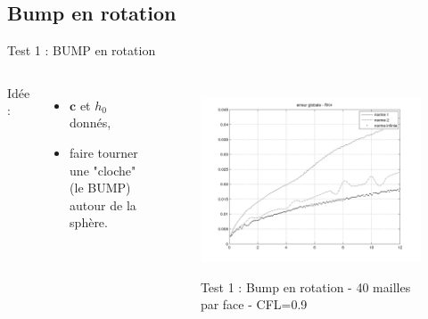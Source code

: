 \documentclass[11pt]{beamer}
\begin{document}
\subsection{Bump en rotation}
\begin{frame}{Test 1 : BUMP en rotation}
\begin{columns}
Idée :

\begin{itemize}
\item $\mathbf{c}$ et $h_0$ donnés,

\item faire tourner une "cloche" (le BUMP) autour de la sphère.
\end{itemize}



\begin{figure}
\href{run:CSapprox_test0.avi}{\includegraphics[scale=0.25]{normerreur_test0_100cfl90.png}} 
\caption{Test 1 : Bump en rotation - 40 mailles par face - CFL=0.9}
\end{figure}

\end{columns}
\end{frame}

\end{document}
